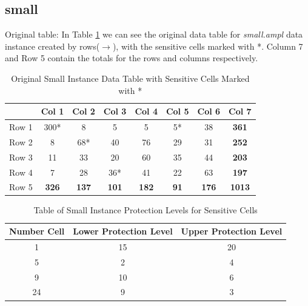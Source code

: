 \documentclass[11pt,a4paper]{article}
\begin{document}
\subsection{small}
Original table: 
In Table \ref{tab:small-original} we can see the original data table for \textit{small.ampl} data instance created by rows($\rightarrow$), with the sensitive cells marked with *.
Column 7 and Row 5 contain the totals for the rows and columns respectively.
\begin{table}[h]
    \centering
    \begin{tabular}{l | c c c c c c c}
             & Col 1 & Col 2 & Col 3 & Col 4 & Col 5 & Col 6 & Col 7 \\
        \toprule
        Row 1 & 300* & 8    & 5    & 5    & 5*   & 38   & \textbf{361} \\
        Row 2 & 8    & 68*  & 40   & 76   & 29   & 31   & \textbf{252} \\
        Row 3 & 11   & 33   & 20   & 60   & 35   & 44   & \textbf{203} \\
        Row 4 & 7    & 28   & 36*  & 41   & 22   & 63   & \textbf{197} \\
        Row 5 & \textbf{326} & \textbf{137} & \textbf{101} & \textbf{182} & \textbf{91} & \textbf{176} & \textbf{1013} \\
    \end{tabular}
    \caption{Original Small Instance Data Table with Sensitive Cells Marked with *}
    \label{tab:small-original}
\end{table}

\begin{table}[h]
    \centering
    \begin{tabular}{c | c | c}
        \textbf{Number Cell} & \textbf{Lower Protection Level} & \textbf{Upper Protection Level} \\
        \toprule
        1	& 15  & 20 \\
        5	& 2   & 4 \\
        9	& 10  & 6 \\
       24	& 9   & 3 \\
    \end{tabular}
    \caption{Table of Small Instance Protection Levels for Sensitive Cells}
    \label{tab:small-protection-levels}
\end{table}
\end{document}
